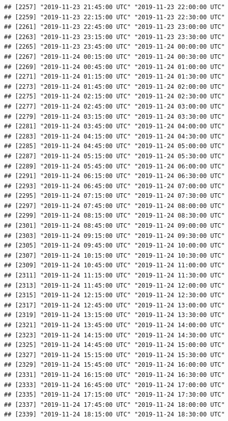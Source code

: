 \documentclass{article}\usepackage[]{graphicx}\usepackage[]{color}
\makeatletter
\newenvironment{kframe}{%
 \def\at@end@of@kframe{}%
 \ifinner\ifhmode%
  \def\at@end@of@kframe{\end{minipage}}%
  \begin{minipage}{\columnwidth}%
 \fi\fi%
 \def\FrameCommand##1{\hskip\@totalleftmargin \hskip-\fboxsep
 \colorbox{shadecolor}{##1}\hskip-\fboxsep
     \hskip-\linewidth \hskip-\@totalleftmargin \hskip\columnwidth}%
 \MakeFramed {\advance\hsize-\width
   \@totalleftmargin\z@ \linewidth\hsize
   \@setminipage}}%
 {\par\unskip\endMakeFramed%
 \at@end@of@kframe}
\newenvironment{knitrout}{}{} %
\makeatother
\begin{document}
\begin{knitrout}
\begin{kframe}
\begin{verbatim}
## [2257] "2019-11-23 21:45:00 UTC" "2019-11-23 22:00:00 UTC"
## [2259] "2019-11-23 22:15:00 UTC" "2019-11-23 22:30:00 UTC"
## [2261] "2019-11-23 22:45:00 UTC" "2019-11-23 23:00:00 UTC"
## [2263] "2019-11-23 23:15:00 UTC" "2019-11-23 23:30:00 UTC"
## [2265] "2019-11-23 23:45:00 UTC" "2019-11-24 00:00:00 UTC"
## [2267] "2019-11-24 00:15:00 UTC" "2019-11-24 00:30:00 UTC"
## [2269] "2019-11-24 00:45:00 UTC" "2019-11-24 01:00:00 UTC"
## [2271] "2019-11-24 01:15:00 UTC" "2019-11-24 01:30:00 UTC"
## [2273] "2019-11-24 01:45:00 UTC" "2019-11-24 02:00:00 UTC"
## [2275] "2019-11-24 02:15:00 UTC" "2019-11-24 02:30:00 UTC"
## [2277] "2019-11-24 02:45:00 UTC" "2019-11-24 03:00:00 UTC"
## [2279] "2019-11-24 03:15:00 UTC" "2019-11-24 03:30:00 UTC"
## [2281] "2019-11-24 03:45:00 UTC" "2019-11-24 04:00:00 UTC"
## [2283] "2019-11-24 04:15:00 UTC" "2019-11-24 04:30:00 UTC"
## [2285] "2019-11-24 04:45:00 UTC" "2019-11-24 05:00:00 UTC"
## [2287] "2019-11-24 05:15:00 UTC" "2019-11-24 05:30:00 UTC"
## [2289] "2019-11-24 05:45:00 UTC" "2019-11-24 06:00:00 UTC"
## [2291] "2019-11-24 06:15:00 UTC" "2019-11-24 06:30:00 UTC"
## [2293] "2019-11-24 06:45:00 UTC" "2019-11-24 07:00:00 UTC"
## [2295] "2019-11-24 07:15:00 UTC" "2019-11-24 07:30:00 UTC"
## [2297] "2019-11-24 07:45:00 UTC" "2019-11-24 08:00:00 UTC"
## [2299] "2019-11-24 08:15:00 UTC" "2019-11-24 08:30:00 UTC"
## [2301] "2019-11-24 08:45:00 UTC" "2019-11-24 09:00:00 UTC"
## [2303] "2019-11-24 09:15:00 UTC" "2019-11-24 09:30:00 UTC"
## [2305] "2019-11-24 09:45:00 UTC" "2019-11-24 10:00:00 UTC"
## [2307] "2019-11-24 10:15:00 UTC" "2019-11-24 10:30:00 UTC"
## [2309] "2019-11-24 10:45:00 UTC" "2019-11-24 11:00:00 UTC"
## [2311] "2019-11-24 11:15:00 UTC" "2019-11-24 11:30:00 UTC"
## [2313] "2019-11-24 11:45:00 UTC" "2019-11-24 12:00:00 UTC"
## [2315] "2019-11-24 12:15:00 UTC" "2019-11-24 12:30:00 UTC"
## [2317] "2019-11-24 12:45:00 UTC" "2019-11-24 13:00:00 UTC"
## [2319] "2019-11-24 13:15:00 UTC" "2019-11-24 13:30:00 UTC"
## [2321] "2019-11-24 13:45:00 UTC" "2019-11-24 14:00:00 UTC"
## [2323] "2019-11-24 14:15:00 UTC" "2019-11-24 14:30:00 UTC"
## [2325] "2019-11-24 14:45:00 UTC" "2019-11-24 15:00:00 UTC"
## [2327] "2019-11-24 15:15:00 UTC" "2019-11-24 15:30:00 UTC"
## [2329] "2019-11-24 15:45:00 UTC" "2019-11-24 16:00:00 UTC"
## [2331] "2019-11-24 16:15:00 UTC" "2019-11-24 16:30:00 UTC"
## [2333] "2019-11-24 16:45:00 UTC" "2019-11-24 17:00:00 UTC"
## [2335] "2019-11-24 17:15:00 UTC" "2019-11-24 17:30:00 UTC"
## [2337] "2019-11-24 17:45:00 UTC" "2019-11-24 18:00:00 UTC"
## [2339] "2019-11-24 18:15:00 UTC" "2019-11-24 18:30:00 UTC"

\end{verbatim}
\end{kframe}
\end{knitrout}
\end{document}
